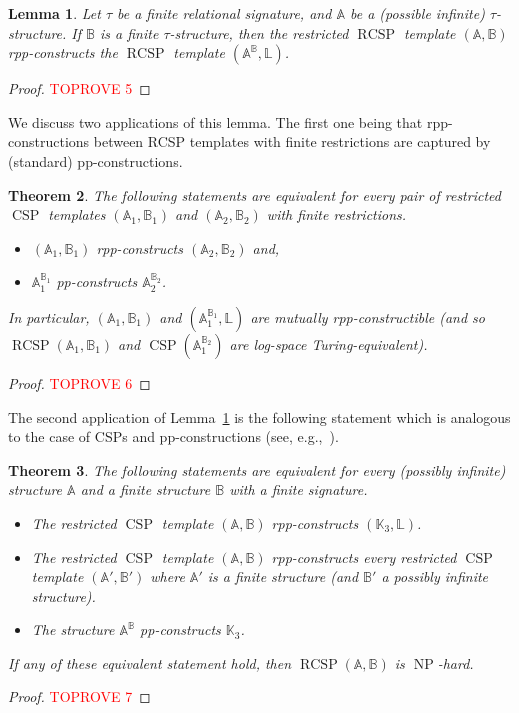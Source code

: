 \documentclass{article}
\newtheorem{theorem}{Theorem}
\newtheorem{lemma}[theorem]{Lemma}
\theoremstyle{definition}
\theoremstyle{remark}
\DeclareMathOperator{\NP}{NP}
\DeclareMathOperator{\CSP}{CSP}
\DeclareMathOperator{\RCSP}{RCSP}
\newcommand{\bA}{{\mathbb A}}
\newcommand{\bB}{{\mathbb B}}
\newcommand{\bK}{{\mathbb K}}
\newcommand{\bL}{{\mathbb L}}
\begin{document}
\begin{lemma}\label{lem:rpp-construction-exponential}
    Let $\tau$ be a finite relational signature, and $\bA$ be a (possible infinite) $\tau$-structure.
    If $\bB$ is a finite $\tau$-structure, then the restricted $\RCSP$ template $(\bA, \bB)$ 
    rpp-constructs the $\RCSP$ template $(\bA^\bB, \bL)$. 
\end{lemma}
\begin{proof}\textcolor{red}{TOPROVE 5}\end{proof}


We discuss two applications of this lemma. The first one being that rpp-constructions
between RCSP templates with finite restrictions are captured by (standard) pp-constructions. 


\begin{theorem}\label{thm:rpp-pp-constructions-finite-restriction}
    The following statements are equivalent for every pair of restricted
    $\CSP$ templates $(\bA_1,\bB_1)$ and $(\bA_2,\bB_2)$ with finite restrictions.
    \begin{itemize}
        \item  $(\bA_1,\bB_1)$ rpp-constructs $(\bA_2,\bB_2)$ and, 
        \item $\bA_1^{\bB_1}$ pp-constructs $\bA_2^{\bB_2}$.
    \end{itemize}
    In particular, $(\bA_1,\bB_1)$ and $(\bA_1^{\bB_1},\bL)$ are mutually rpp-constructible
    (and so $\RCSP(\bA_1,\bB_1)$ and $\CSP(\bA_1^{\bB_2})$ are log-space Turing-equivalent).
\end{theorem}
\begin{proof}\textcolor{red}{TOPROVE 6}\end{proof}

The second application of Lemma~\ref{lem:rpp-construction-exponential} is the following
statement which is analogous to the case of CSPs and pp-constructions (see, e.g.,~\cite[Theorem 3.2.2]{Book}).

\begin{theorem}\label{thm:rpp-construction-K3}
    The following statements are equivalent for every (possibly infinite) structure $\bA$
    and a finite structure $\bB$ with a finite signature. 
    \begin{itemize}
        \item The restricted $\CSP$ template $(\bA,\bB)$ rpp-constructs $(\bK_3,\bL)$.
        \item The restricted $\CSP$ template $(\bA,\bB)$ rpp-constructs every restricted
        $\CSP$ template $(\bA',\bB')$ where $\bA'$ is a finite structure (and $\bB'$ a possibly infinite structure).
        \item The structure $\bA^\bB$ pp-constructs $\bK_3$. 
    \end{itemize}
    If any of these equivalent statement hold, then $\RCSP(\bA,\bB)$ is $\NP$-hard.
\end{theorem}
\begin{proof}\textcolor{red}{TOPROVE 7}\end{proof}
\end{document}
